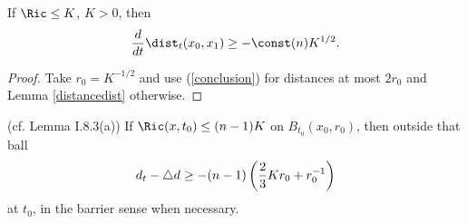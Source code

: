 \begin{corollary}
  \label{cor:kl-length-distortion-estimates-estimates-length-distortion-estimates}
  \label{bound1}
  \cite[Theorem 17.2]{Hamilton}
If $\Ric\le K$, $K>0$, then
\begin{equation}{d\over dt}\dist_t(x_0,x_1)\ge-\const(n)K^{1/2}.\end{equation}
\end{corollary}
\begin{proof}
\sketch
Take $r_0=K^{-1/2}$ and use (\ref{conclusion}) for distances at most $2r_0$ and
Lemma \ref{distancedist} otherwise.
\end{proof}
\begin{lemma}
  \label{lem:kl-length-distortion-estimates-estimates-distance-distortion}
  (cf. Lemma I.8.3(a)) \label{I.8.3a}
If $\Ric(x,t_0)\le(n-1)K$ on $B_{t_0}(x_0,r_0)$, then outside that ball
\begin{equation}d_t-\triangle d\ge-(n-1)\left({2\over3}Kr_0+r_0^{-1}\right)
\end{equation}
at $t_0$, in the barrier sense when necessary.
\end{lemma}

